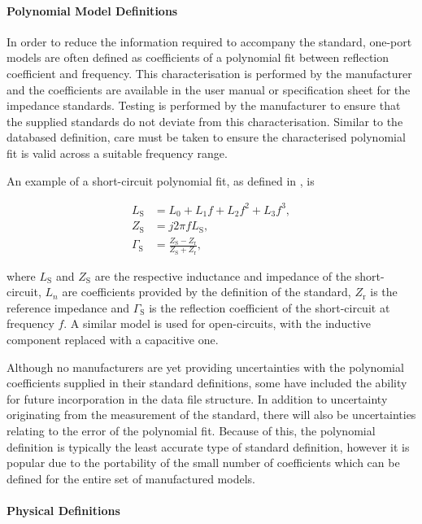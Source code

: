 \documentclass[../thesis/thesis.tex]{subfiles}
\begin{document}
\begin{refsection}
\paragraph{Polynomial Model Definitions}

In order to reduce the information required to accompany the standard, one-port models are often defined as coefficients of a polynomial fit between reflection coefficient and frequency. This characterisation is performed by the manufacturer and the coefficients are available in the user manual or specification sheet for the impedance standards. Testing is performed by the manufacturer to ensure that the supplied standards do not deviate from this characterisation. Similar to the databased definition, care must be taken to ensure the characterised polynomial fit is valid across a suitable frequency range.

An example of a short-circuit polynomial fit, as defined in \cite{Keysight_2016}, is

\begin{align}
	L_\textrm{S} &= L_0 + L_1f + L_2f^2 + L_3f^3, \\
	Z_\textrm{S} &= j2\pi fL_\textrm{S}, \\
	\Gamma_\textrm{S} &= \frac{Z_\textrm{S} - Z_\textrm{r}}{Z_\textrm{S} + Z_\textrm{r}},
\end{align}

where $L_\textrm{S}$ and $Z_\textrm{S}$ are the respective inductance and impedance of the short-circuit, $L_n$ are coefficients provided by the definition of the standard,  $Z_\textrm{r}$ is the reference impedance and $\Gamma_\textrm{S}$ is the reflection coefficient of the short-circuit at frequency $f$. A similar model is used for open-circuits, with the inductive component replaced with a capacitive one.

Although no manufacturers are yet providing uncertainties with the polynomial coefficients supplied in their standard definitions, some have included the ability for future incorporation in the data file structure. In addition to uncertainty originating from the measurement of the standard, there will also be uncertainties relating to the error of the polynomial fit. Because of this, the polynomial definition is typically the least accurate type of standard definition, however it is popular due to the portability of the small number of coefficients which can be defined for the entire set of manufactured models.

\paragraph{Physical Definitions}


\end{refsection}
\end{document}
